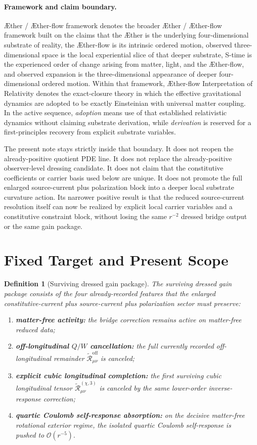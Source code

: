 \documentclass[11pt]{article}
\newcommand{\Aether}{\AE{}ther}
\newcommand{\Aflow}{\AE{}ther-flow}
\newcommand{\TheoryName}{\Aflow{} Interpretation of Relativity}
\newcommand{\TheoryProgram}{\Aether{} / \Aflow{} framework}
\newcommand{\ReOff}{\widetilde{\mathcal R}_{\mu\nu}^{\mathrm{off}}}
\newcommand{\ReLongThree}{\widetilde{\mathcal R}_{\mu\nu}^{(\chi,3)}}
\newtheorem{definition}{Definition}
\begin{document}
\paragraph{Framework and claim boundary.}
\TheoryProgram{} denotes the broader \Aether{} / \Aflow{} framework built on the claims that the \Aether{} is the underlying four-dimensional substrate of reality, the \Aflow{} is its intrinsic ordered motion, observed three-dimensional space is the local experiential slice of that deeper substrate, S-time is the experienced order of change arising from matter, light, and the \Aflow{}, and observed expansion is the three-dimensional appearance of deeper four-dimensional ordered motion. Within that framework, \TheoryName{} denotes the exact-closure theory in which the effective gravitational dynamics are adopted to be exactly Einsteinian with universal matter coupling. In the active sequence, \emph{adoption} means use of that established relativistic dynamics without claiming substrate derivation, while \emph{derivation} is reserved for a first-principles recovery from explicit substrate variables.

The present note stays strictly inside that boundary. It does not reopen the already-positive quotient PDE line. It does not replace the already-positive observer-level dressing candidate. It does not claim that the constitutive coefficients or carrier basis used below are unique. It does not promote the full enlarged source-current plus polarization block into a deeper local substrate curvature action. Its narrower positive result is that the reduced source-current resolution itself can now be realized by explicit local carrier variables and a constitutive constraint block, without losing the same \(r^{-2}\) dressed bridge output or the same gain package.

\section{Fixed Target and Present Scope}

\begin{definition}[Surviving dressed gain package]
\label{def:gains}
The \emph{surviving dressed gain package} consists of the four already-recorded features that the enlarged constitutive-current plus source-current plus polarization sector must preserve:
\begin{enumerate}
    \item \textbf{matter-free activity:} the bridge correction remains active on matter-free reduced data;
    \item \textbf{off-longitudinal \(Q/W\) cancellation:} the full currently recorded off-longitudinal remainder \(\ReOff\) is canceled;
    \item \textbf{explicit cubic longitudinal completion:} the first surviving cubic longitudinal tensor \(\ReLongThree\) is canceled by the same lower-order inverse-response correction;
    \item \textbf{quartic Coulomb self-response absorption:} on the decisive matter-free rotational exterior regime, the isolated quartic Coulomb self-response is pushed to \(\mathcal O(r^{-5})\).
\end{enumerate}
\end{definition}
\end{document}
